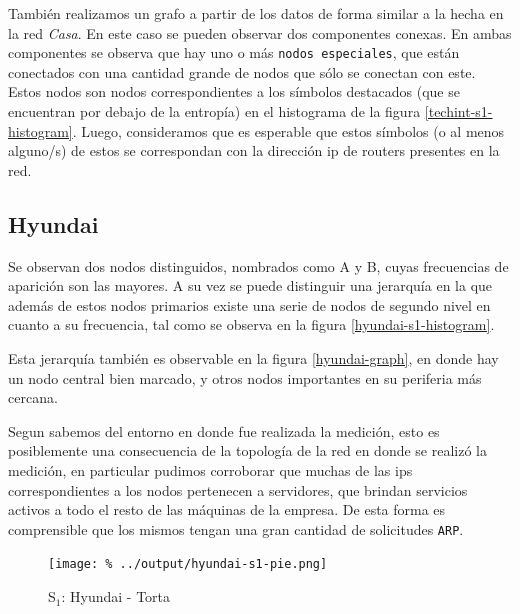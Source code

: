 \documentclass[final,inline,a4paper,narroweqnarray]{ieee}
\begin{document}
  También realizamos un grafo a partir de los datos de forma similar a la
  hecha en la red \emph{Casa}. En este caso se pueden observar dos componentes
  conexas. En ambas componentes se observa que hay uno o más \texttt{nodos
  especiales}, que están conectados con una cantidad grande de nodos que
  sólo se conectan con este. Estos nodos son nodos correspondientes a
  los símbolos destacados (que se encuentran por debajo de la entropía) en
  el histograma de la figura \ref{techint-s1-histogram}. Luego, consideramos
  que es esperable que estos símbolos (o al menos alguno/s) de estos se
  correspondan con la dirección ip de routers presentes en la red.

  \subsection{Hyundai}

Se observan dos nodos distinguidos, nombrados como A y B, cuyas
frecuencias de aparición son las mayores. A su vez se puede distinguir una
jerarquía en la que además de estos nodos primarios existe una serie de
nodos de segundo nivel en cuanto a su frecuencia, tal como se observa en
la figura \ref{hyundai-s1-histogram}.

Esta jerarquía también es observable en la figura \ref{hyundai-graph}, en
donde hay un nodo central bien marcado, y otros nodos importantes  en su periferia más
cercana.

Segun sabemos del entorno en donde fue realizada la medición, esto es
posiblemente una consecuencia de la topología de la red en donde se
realizó la medición, en particular pudimos corroborar que muchas de las
ips correspondientes a los nodos pertenecen a servidores, que brindan
servicios activos a todo el resto de las máquinas de la empresa. De esta
forma es comprensible que los mismos tengan una gran cantidad de
solicitudes \texttt{ARP}.


    \begin{figure}[H]\begin{center}
      \texttt{[image: \%
      ../output/hyundai-s1-pie.png]}
      \vspace{-2em}
      \caption{S$_1$: Hyundai - Torta}
      \label{hyundai-s1-pie}
    \end{center}\end{figure}
\end{document}
